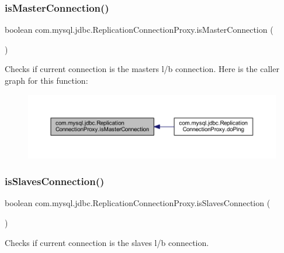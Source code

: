 \subsubsection{\texorpdfstring{is\+Master\+Connection()}{isMasterConnection()}}
{\footnotesize\ttfamily boolean com.\+mysql.\+jdbc.\+Replication\+Connection\+Proxy.\+is\+Master\+Connection (\begin{DoxyParamCaption}{ }\end{DoxyParamCaption})}

Checks if current connection is the masters l/b connection. Here is the caller graph for this function\+:
\nopagebreak
\begin{figure}[H]
\begin{center}
\leavevmode
\includegraphics[width=350pt]{classcom_1_1mysql_1_1jdbc_1_1_replication_connection_proxy_ab25d7e5a9f2b59a77d9ec427dde0b7df_icgraph}
\end{center}
\end{figure}
\mbox{\label{classcom_1_1mysql_1_1jdbc_1_1_replication_connection_proxy_a79f83682c33e022f47c7392a5dd242af}} 
\subsubsection{\texorpdfstring{is\+Slaves\+Connection()}{isSlavesConnection()}}
{\footnotesize\ttfamily boolean com.\+mysql.\+jdbc.\+Replication\+Connection\+Proxy.\+is\+Slaves\+Connection (\begin{DoxyParamCaption}{ }\end{DoxyParamCaption})}

Checks if current connection is the slaves l/b connection. \mbox{\label{classcom_1_1mysql_1_1jdbc_1_1_replication_connection_proxy_a87e8d96ac3318b83e27d47dcf813c500}} 
